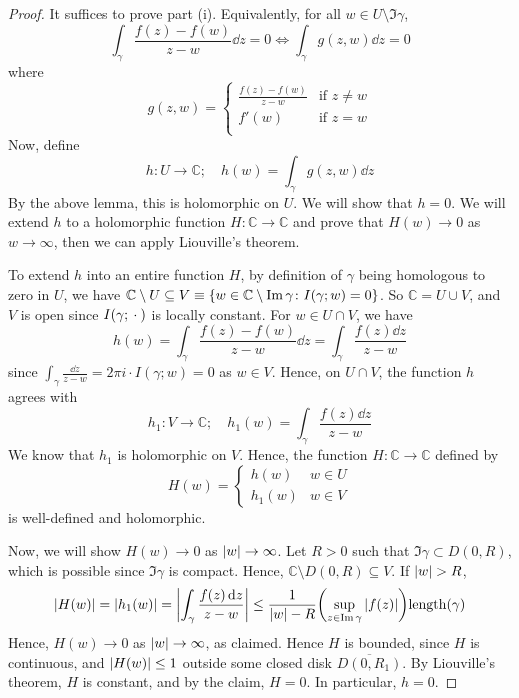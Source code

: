 \begin{proof}
	It suffices to prove part (i).
	Equivalently, for all \( w \in U \setminus \Im \gamma \),
	\[ \int_\gamma \frac{f(z) - f(w)}{z-w} \dd{z} = 0 \iff \int_\gamma g(z,w) \dd{z} = 0 \]
	where
	\[ g(z,w) = \begin{cases}
		\frac{f(z) - f(w)}{z-w} & \text{if } z \neq w \\
		f'(w) & \text{if } z = w \\
	\end{cases} \]
	Now, define
	\[ h \colon U \to \mathbb C;\quad h(w) = \int_\gamma g(z,w) \dd{z} \]
	By the above lemma, this is holomorphic on \( U \).
	We will show that \( h = 0 \).
	We will extend \( h \) to a holomorphic function \( H \colon \mathbb C \to \mathbb C \) and prove that \( H(w) \to 0 \) as \( w \to \infty \), then we can apply Liouville's theorem.

	To extend \( h \) into an entire function \( H \), by definition of \( \gamma \) being homologous to zero in \( U \), we have \( \mathbb C \setminus U \subseteq V \equiv \qty{w \in \mathbb C \setminus \Im \gamma \colon I(\gamma;w) = 0 } \).
	So \( \mathbb C = U \cup V \), and \( V \) is open since \( I(\gamma;{}\cdot{}) \) is locally constant.
	For \( w \in U \cap V \), we have
	\[ h(w) = \int_\gamma \frac{f(z) - f(w)}{z-w} \dd{z} = \int_\gamma \frac{f(z) \dd{z}}{z-w} \]
	since \( \int_\gamma \frac{\dd{z}}{z-w} = 2\pi i \cdot I(\gamma;w) = 0 \) as \( w \in V \).
	Hence, on \( U \cap V \), the function \( h \) agrees with
	\[ h_1 \colon V \to \mathbb C;\quad h_1(w) = \int_\gamma \frac{f(z) \dd{z}}{z-w} \]
	We know that \( h_1 \) is holomorphic on \( V \).
	Hence, the function \( H \colon \mathbb C \to \mathbb C \) defined by
	\[ H(w) = \begin{cases}
		h(w) & w \in U \\
		h_1(w) & w \in V
	\end{cases} \]
	is well-defined and holomorphic.

	Now, we will show \( H(w) \to 0 \) as \( \abs{w} \to \infty \).
	Let \( R > 0 \) such that \( \Im \gamma \subset D(0,R) \), which is possible since \( \Im \gamma \) is compact.
	Hence, \( \mathbb C \setminus D(0,R) \subseteq V \).
	If \( \abs{w} > R \),
	\[ \abs{H(w)} = \abs{h_1(w)} = \abs{\int_\gamma \frac{f(z) \dd{z}}{z-w}} \leq \frac{1}{\abs{w} - R} \qty( \sup_{z \in \Im \gamma} \abs{f(z)} ) \mathrm{length}(\gamma) \]
	Hence, \( H(w) \to 0 \) as \( \abs{w} \to \infty \), as claimed.
	Hence \( H \) is bounded, since \( H \) is continuous, and \( \abs{H(w)} \leq 1 \) outside some closed disk \( \overline{D(0,R_1)} \).
	By Liouville's theorem, \( H \) is constant, and by the claim, \( H = 0 \).
	In particular, \( h = 0 \).
\end{proof}

